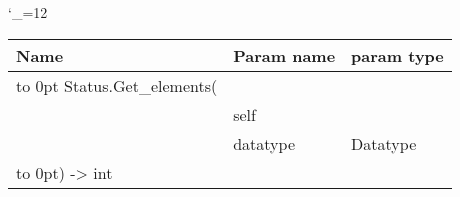 \begingroup \catcode`\_=12 \tt
\begin{tabular}{lll}
\toprule
\textrm{Name}&\textrm{Param name}&\textrm{param type}\\
\midrule
\hbox to 0pt {Status.Get_elements(\hss}\\
& self\\
& datatype & Datatype\\
\hbox to 0pt{) -> int\hss}\\
\bottomrule
\end{tabular}
\endgroup

